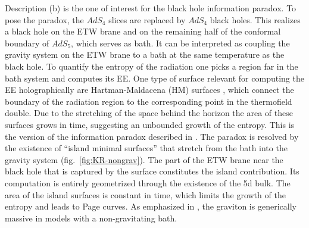 \documentclass[aps,prd,11pt,notitlepage,longbibliography,nofootinbib,tightenlines,preprintnumbers]{revtex4-1}
\begin{document}
Description (b) is the one of interest for the black hole information paradox. 
To pose the paradox, the $AdS_4$ slices are replaced by $AdS_4$ black holes. 
This realizes a black hole on the ETW brane and on the remaining half of the conformal boundary of $AdS_5$, which serves as bath. 
It can be interpreted as coupling the gravity system on the ETW brane to a bath at the same temperature as the black hole.
To quantify the entropy of the radiation one picks a region far in the bath system and computes its EE.
%
One type of surface relevant for computing the EE holographically are Hartman-Maldacena (HM) surfaces \cite{Hartman:2013qma}, which connect the boundary of the radiation region to the corresponding point in the thermofield double.
Due to the stretching of the space behind the horizon the area of these surfaces grows in time,
suggesting an unbounded growth of the entropy. This is the version of the information paradox described in \cite{Almheiri:2019yqk}.
%
The paradox is resolved by the existence of ``island minimal surfaces'' that stretch from the bath into the gravity system (fig.~\ref{fig:KR-nongrav}). 
The part of the ETW brane near the black hole that is captured by the surface constitutes the island contribution. Its computation is entirely geometrized through the existence of the 5d bulk.
The area of the island surfaces is constant in time, which limits the growth of the entropy and leads to Page curves.
As emphasized in \cite{Geng:2020qvw}, the graviton is generically massive in models with a non-gravitating bath. 
\end{document}
